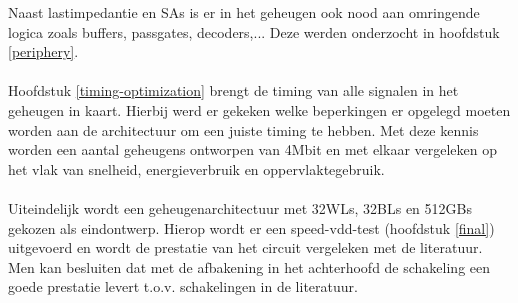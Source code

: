 Naast lastimpedantie en SAs is er in het geheugen ook nood aan omringende logica zoals buffers, passgates, decoders,... Deze werden onderzocht in hoofdstuk \ref{periphery}.\\\\
Hoofdstuk \ref{timing-optimization} brengt de timing van alle signalen in het geheugen in kaart. Hierbij werd er gekeken welke beperkingen er opgelegd moeten worden aan de architectuur om een juiste timing te hebben. Met deze kennis worden een aantal geheugens ontworpen van 4Mbit en met elkaar vergeleken op het vlak van snelheid, energieverbruik en oppervlaktegebruik.\\\\
Uiteindelijk wordt een geheugenarchitectuur met 32WLs, 32BLs en 512GBs gekozen als eindontwerp. Hierop wordt er een speed-vdd-test (hoofdstuk \ref{final}) uitgevoerd en wordt de prestatie van het circuit vergeleken met de literatuur. Men kan besluiten dat met de afbakening in het achterhoofd de schakeling een goede prestatie levert t.o.v. schakelingen in de literatuur.
